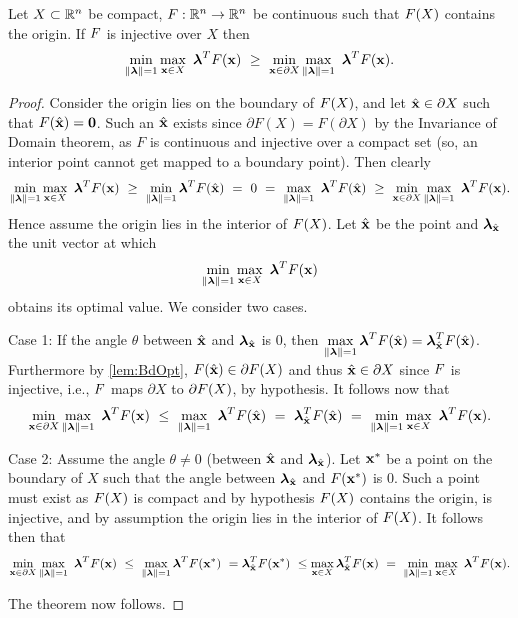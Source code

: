 \begin{thm} 
  \label{thm:MainIneq}
  Let $X\subset\mathbb{R}^n$ be compact, $F:\mathbb{R}^n\rightarrow\mathbb{R}^n$ be continuous such that $F(X)$ contains the origin. 
  If $F$ is injective over $X$ then
  \[
  \min\limits_{\lVert\boldsymbol{\lambda}\rVert=1}\max\limits_{\mathbf{x}\in X}\ \boldsymbol{\lambda}^TF(\mathbf{x}) ~\geq~ \min\limits_{\mathbf{x}\in \partial X} \max\limits_{\lVert\boldsymbol{\lambda}\rVert=1}\ \boldsymbol{\lambda}^TF(\mathbf{x}).
  \]
  \begin{proof}
    Consider the origin lies on the boundary of $F(X)$, and let $\hat{\mathbf{x}} \in \partial X$ such that $F(\hat{\mathbf{x}})=\mathbf{0}$. 
    Such an $\hat{\mathbf{x}}$ exists since $\partial F(X) = F(\partial X)$ by the Invariance of Domain theorem, as $F$ is continuous and injective over a compact set (so, an interior point cannot get mapped to a boundary point). 
    Then  clearly
    \[
    \min\limits_{\norm{\vlambda}=1}\max\limits_{\vx\in X}\ \vlambda^T\vF(\vx) ~\geq~
    \min\limits_{\norm{\vlambda}=1}\vlambda^T\vF(\hat{\vx}) ~=~ 0 ~=~
    \max\limits_{\norm{\vlambda}=1}\ \vlambda^T\vF(\hat{\vx}) ~\geq~
    \min\limits_{\vx\in \partial X}\max\limits_{\norm{\vlambda}=1}\ \vlambda^T\vF(\vx).
\]
Hence assume the origin lies in the interior of $F(X)$.
Let $\hat{\mathbf{x}}$ be the point and $\boldsymbol{\lambda}_{\hat{\mathbf{x}}}$ the unit vector at which
\[
\min\limits_{\lVert\boldsymbol{\lambda}\rVert=1}\max\limits_{\mathbf{x}\in X}\ \boldsymbol{\lambda}^TF(\mathbf{x})
\]
obtains its optimal value.
We consider two cases.

Case 1: If the angle $\theta$ between $\hat{\mathbf{x}}$ and $\boldsymbol{\lambda}_{\hat{\mathbf{x}}}$ is $0$, then $\displaystyle \max\limits_{\lVert\boldsymbol{\lambda}\rVert=1}\boldsymbol{\lambda}^TF(\hat{\mathbf{x}}) = \boldsymbol{\lambda}_{\hat{\mathbf{x}}}^TF(\hat{\mathbf{x}})$. 
Furthermore by \cref{lem:BdOpt}, $F(\hat{\mathbf{x}}) \in \partial F(X)$ and thus $\hat{\mathbf{x}}\in \partial X$ since $F$ is injective, i.e., $F$ maps $\partial X$ to $\partial F(X)$, by hypothesis. 
It follows now that
\[
\min\limits_{\vx\in \partial X}\max\limits_{\norm{\vlambda}=1}\ \vlambda^T\vF(\vx) ~\leq~
\max\limits_{\norm{\vlambda}=1}\ \vlambda^T\vF(\hat{\vx}) ~=~
\vlambda_{\hat{\vx}}^T\vF(\hat{\vx}) ~=~
\min\limits_{\norm{\vlambda}=1}\max\limits_{\vx\in X}\ \vlambda^T\vF(\vx).
\]

Case 2: Assume the angle $\theta \neq 0$ (between $\hat{\mathbf{x}}$ and $\boldsymbol{\lambda}_{\hat{\mathbf{x}}}$). 
Let $\mathbf{x}^*$ be a point on the boundary of $X$ such that the angle between $\boldsymbol{\lambda}_{\hat{\mathbf{x}}}$ and $F(\mathbf{x}^*)$ is 0. 
Such a point must exist as $F(X)$ is compact and by hypothesis $F(X)$ contains the origin, is injective,
and by assumption the origin lies in the interior of $F(X)$. 
It follows then that
\[
\min\limits_{\vx\in \partial X}\max\limits_{\norm{\vlambda}=1}\ \vlambda^T\vF(\vx) ~\leq~
\max\limits_{\norm{\vlambda}=1}\vlambda^T \vF(\vx^*) ~=
\vlambda_{\hat{\vx}}^T\vF(\vx^*) ~\leq
\max\limits_{\vx\in X}\vlambda_{\hat{\vx}}^T\vF(\vx) ~=~
\min\limits_{\norm{\vlambda}=1}\max\limits_{\vx\in X}\ \vlambda^T\vF(\vx).
\]

The theorem now follows.
\end{proof}
\end{thm}

